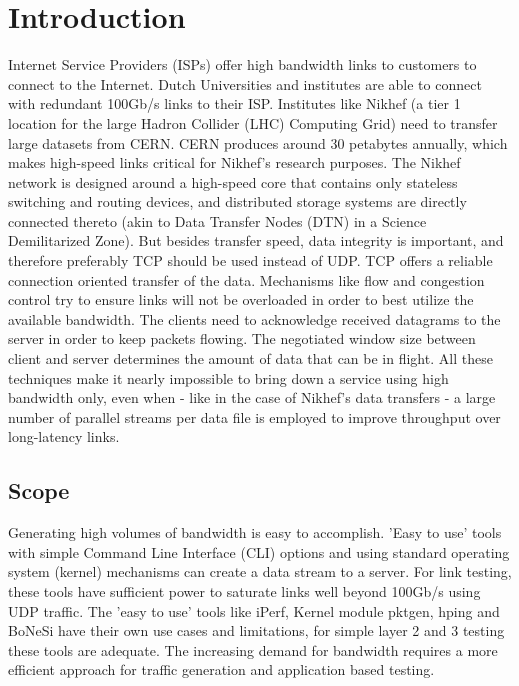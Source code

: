 \chapter{Introduction}\label{ch:intro}
Internet Service Providers (ISPs) offer high bandwidth links to customers to connect to the Internet. Dutch Universities and institutes are able to connect with redundant 100Gb/s links to their ISP.
Institutes like Nikhef (a tier 1 location for the large Hadron Collider (LHC) Computing Grid) need to transfer large datasets from CERN. CERN produces around 30 petabytes annually\cite{cerndata}, which makes high-speed links critical for Nikhef's research purposes.
The Nikhef network is designed around a high-speed core that contains only stateless switching and routing devices, and distributed storage systems are directly connected thereto (akin to Data Transfer Nodes (DTN) in a Science Demilitarized Zone).
But besides transfer speed, data integrity is important, and therefore preferably TCP should be used instead of UDP. TCP offers a reliable connection oriented transfer of the data. 
Mechanisms like flow and congestion control try to ensure links will not be overloaded in order to best utilize the available bandwidth. The clients need to acknowledge received datagrams to the server in order to keep packets flowing. 
The negotiated window size between client and server determines the amount of data that can be in flight.  
All these techniques make it nearly impossible to bring down a service using high bandwidth only, even when - like in the case of Nikhef's data transfers - a large number of parallel streams per data file is employed to improve throughput over long-latency links.

\section{Scope}\label{sec:scope}

Generating high volumes of bandwidth is easy to accomplish. 'Easy to use' tools with simple Command Line Interface (CLI) options and using standard operating system (kernel) mechanisms can create a data stream to a server. For link testing, these tools have sufficient power to saturate links well beyond 100Gb/s using UDP traffic. 
The 'easy to use' tools like iPerf\cite{iperf}, Kernel module pktgen\cite{pktgen-kernel}, hping\cite{hping} and BoNeSi\cite{bonesi} have their own use cases and limitations, for simple layer 2 and 3 testing these tools are adequate.
The increasing demand for bandwidth requires a more efficient approach for traffic generation and application based testing. 


